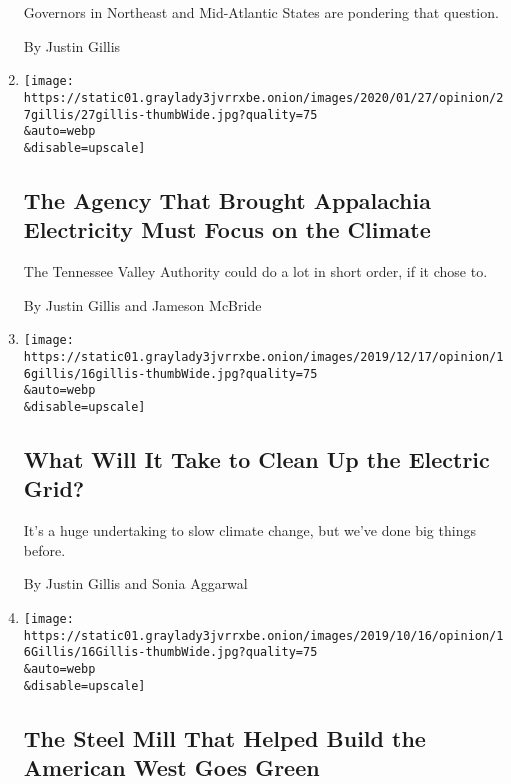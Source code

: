 \begin{enumerate}
  Governors in Northeast and Mid-Atlantic States are pondering that
  question.

  By Justin Gillis
\item
  \href{/2020/01/27/opinion/climate-Tennessee-Valley-Authority.html}{}

  \texttt{[image: https://static01.graylady3jvrrxbe.onion/images/2020/01/27/opinion/27gillis/27gillis-thumbWide.jpg?quality=75\\\&auto=webp\\\&disable=upscale]}

  \hypertarget{the-agency-that-brought-appalachia-electricity-must-focus-on-the-climate}{%
  \subsection{The Agency That Brought Appalachia Electricity Must Focus
  on the
  Climate}\label{the-agency-that-brought-appalachia-electricity-must-focus-on-the-climate}}

  The Tennessee Valley Authority could do a lot in short order, if it
  chose to.

  By Justin Gillis and Jameson McBride
\item
  \href{/2019/12/16/opinion/climate-change-grid.html}{}

  \texttt{[image: https://static01.graylady3jvrrxbe.onion/images/2019/12/17/opinion/16gillis/16gillis-thumbWide.jpg?quality=75\\\&auto=webp\\\&disable=upscale]}

  \hypertarget{what-will-it-take-to-clean-up-the-electric-grid}{%
  \subsection{What Will It Take to Clean Up the Electric
  Grid?}\label{what-will-it-take-to-clean-up-the-electric-grid}}

  It's a huge undertaking to slow climate change, but we've done big
  things before.

  By Justin Gillis and Sonia Aggarwal
\item
  \href{/2019/10/16/opinion/solar-colorado-steel-mill.html}{}

  \texttt{[image: https://static01.graylady3jvrrxbe.onion/images/2019/10/16/opinion/16Gillis/16Gillis-thumbWide.jpg?quality=75\\\&auto=webp\\\&disable=upscale]}

  \hypertarget{the-steel-mill-that-helped-build-the-american-west-goes-green}{%
  \subsection{The Steel Mill That Helped Build the American West Goes
  Green}\label{the-steel-mill-that-helped-build-the-american-west-goes-green}}


\end{enumerate}
